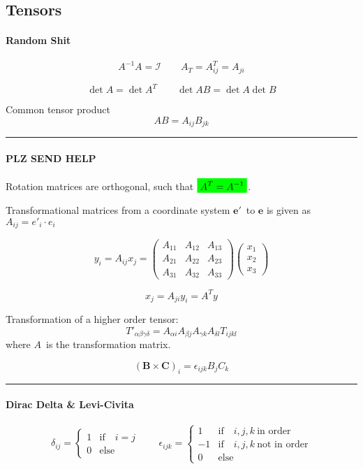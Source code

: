 \documentclass[10pt,a4paper]{article}
\renewcommand{\b}{\textbf}
\newcommand{\holine}{\rule{286pt}{1pt}}
\newcommand{\gr}[1]{\colorbox{green}{$\displaystyle #1$}}
\begin{document}
\begin{multicols}{2}
\part*{Tensors}
\subsection*{Random Shit}
\[
    A^{-1}A = \mathcal{I} \quad\quad A_T = A_{ij}^T = A_{ji}
\]
    
\[
    \det{A} = \det{A^T} \quad\quad \det{AB} = \det{A}\det{B}
\]

Common tensor product
\[
    AB = A_{ij}B_{jk}
\]

\holine
\subsection*{PLZ SEND HELP}

Rotation matrices are orthogonal, such that $\gr{A^T = A^{-1}}$.

Transformational matrices from a coordinate system $\b{e}'$ to $\b{e}$ is given as $A_{ij} = e'_i \cdot e_i$

\[
    y_i = A_{ij}x_j =
    \begin{pmatrix}
        A_{11} & A_{12} & A_{13} \\
        A_{21} & A_{22} & A_{23} \\
        A_{31} & A_{32} & A_{33}
    \end{pmatrix}
    \begin{pmatrix}
        x_1 \\
        x_2 \\
        x_3
    \end{pmatrix}
\]

\[
    x_j = A_{ji}y_i = A^Ty
\]

Transformation of a higher order tensor:
\[
    T'_{\alpha\beta\gamma\delta} = A_{\alpha i}A_{\beta j}A_{\gamma k}A_{\delta l}T_{ijkl}
\]
where $A$ is the transformation matrix.


\[
    (\b{B}\times\b{C})_i = \epsilon_{ijk}B_jC_k
\]

\holine
\subsection*{Dirac Delta \& Levi-Civita}
\[
    \delta_{ij} = \begin{cases}
    1 &\text{if} \quad i=j \\
    0 &\text{else}
    \end{cases}
    \quad\quad
    \epsilon_{ijk} = \begin{cases}
    1 &\text{if} \quad i,j,k \ \text{in order} \\
    -1 &\text{if} \quad i,j,k \ \text{not in order} \\
    0 &\text{else}
    \end{cases}
\]


\end{multicols}
\end{document}
